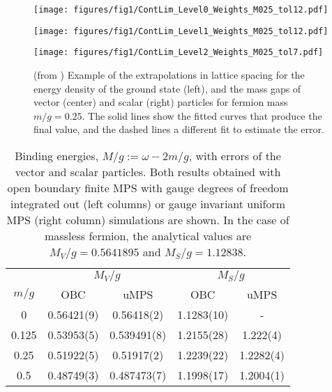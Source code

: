 \documentclass[epj,final]{svjour}
\begin{document}
\begin{figure}
\begin{minipage}[b]{.3\columnwidth}
\texttt{[image: figures/fig1/ContLim\_Level0\_Weights\_M025\_tol12.pdf]}
\end{minipage}
\hspace{.01\columnwidth}
\begin{minipage}[b]{.3\columnwidth} 
\texttt{[image: figures/fig1/ContLim\_Level1\_Weights\_M025\_tol12.pdf]}
\end{minipage}
\hspace{.01\columnwidth}
\begin{minipage}[b]{.3\columnwidth} 
\texttt{[image: figures/fig1/ContLim\_Level2\_Weights\_M025\_tol7.pdf]}
\end{minipage}
\caption{(from \cite{Banuls2013}) Example of the extrapolations in lattice spacing for the energy density of the ground state (left), and the mass gaps of vector (center) and scalar (right) particles for fermion mass $m/g=0.25$. The solid lines show the fitted curves that produce the final value, and the dashed lines a different fit to estimate the error.}
\label{fig:massMPS}
\end{figure}

\begin{table}
\begin{center}
\begin{tabular}{|c|c|c|c|c|}
\hline
&\multicolumn{2}{c|}{$M_V/g$}
&\multicolumn{2}{c|}{$M_S/g$} 
\\ 
\cline{2-5}
$m/g$ &
OBC \cite{Banuls2013} &
uMPS \cite{buyens2014matrix} &
OBC \cite{Banuls2013} &
uMPS \cite{buyens2014matrix} \\
\hline
0	&
0.56421(9) &
0.56418(2)& 
1.1283(10) &
- \\
\hline
0.125 &
0.53953(5) &
0.539491(8)&
1.2155(28)  &  1.222(4) \\ \hline
0.25 &
0.51922(5) & 0.51917(2)
&
1.2239(22)  &  1.2282(4)\\ \hline
0.5 &
0.48749(3) & 0.487473(7)
&
1.1998(17)  &  1.2004(1)\\ \hline
\end{tabular}
\caption{Binding energies, $M/g:=\omega-2 m/g$, with errors of the vector and scalar particles. Both results obtained with  open boundary finite MPS with gauge degrees of freedom integrated out (left columns) or gauge invariant uniform MPS \cite{buyens2014matrix} (right column) simulations are shown. In the case of massless fermion, the analytical values are
$M_V/g=0.5641895$
and $M_S/g=1.12838$.}
\label{tab:specSchw}
\end{center}
\vspace{-.5cm}
\end{table}
\end{document}
